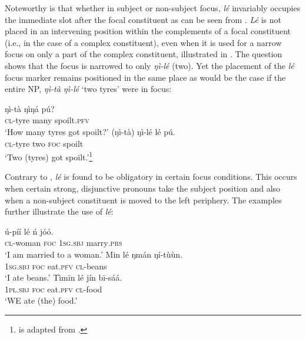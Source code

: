 \documentclass[output=paper,colorlinks,citecolor=brown]{langscibook}
\begin{document}
Noteworthy is that whether in subject or non-subject focus, \textit{lé} invariably occupies the immediate slot after the focal constituent as can be seen from . \textit{Lé} is not placed in an intervening position within the complements of a focal constituent (i.e., in the case of a complex constituent), even when it is used for a narrow focus on only a part of the complex constituent, illustrated in . The question  shows that the focus is narrowed to only \textit{ŋì-lé} (two). Yet the placement of the \textit{lé} focus marker  remains positioned in the same place as would be the case if the entire NP, \textit{ŋì-tà  ŋì-lé} ‘two tyres’ were in focus:

\ea%
    \label{ex:bisilki:23}
    \ea\label{ex:bisilki:23a}
    \gll    ŋì-tà		ŋìŋá		pú?\\
            \textsc{cl-}tyre	many		spoilt\textsc{.pfv}\\
    \glt    ‘How many tyres got spoilt?’
    \ex\label{ex:bisilki:23b}
    \gll    (ŋì-tà)		ŋì-lé	lé	pú.\\
            \textsc{cl-}tyre	two	\textsc{foc}	spoilt\\
    \glt    ‘Two (tyres)  got spoilt.’\footnote{ is adapted from \citet[187]{Schwarz2009}.}
    \z
\z

Contrary to \citet{Schwarz2009}, \textit{lé} is found to be obligatory in certain focus conditions. This occurs when certain strong, disjunctive pronouns take the subject position and also when a non-subject constituent is moved to the left periphery. The examples  further illustrate the use of \textit{lé}:

\ea%
    \label{ex:bisilki:24}
    \ea\label{ex:bisilki:24a}
    \gll    ú-píí		lé	ń		jóó.\\
            \textsc{cl-}woman	\textsc{foc}	\textsc{1sg.sbj}	marry\textsc{.prs}\\
    \glt    ‘I am married to a woman.’
    \ex\label{ex:bisilki:24b}
    \gll    Min	lé	ŋmán	ŋí-tùùn.\\
            \textsc{1sg.sbj}	\textsc{foc}	eat\textsc{.pfv}	\textsc{cl-}beans\\
    \glt    ‘I ate beans.’
    \ex\label{ex:bisilki:24c}
    \gll    Tìmīn		lé	jín		bī-sáá.\\
            \textsc{1pl.sbj}	\textsc{foc}	eat\textsc{.pfv}	\textsc{cl-}food\\
    \glt    ‘WE ate (the) food.’
    \z
\z
\end{document}
